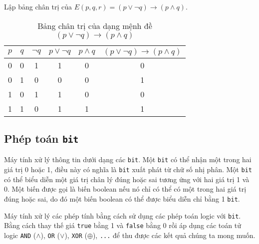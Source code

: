 \documentclass{standalone} %
\begin{document}
        
        
        \begin{example}
            Lập bảng chân trị của $E(p, q, r) = (p \lor \neg q) \to (p \land q)$.
        \end{example}
        \begin{table}[h!]
            \centering
            \setlength{\tabcolsep}{18pt}
            \begin{tabular}{c c c c c c}
                $p$ & $q$ & $\neg q$ & $p \lor \neg q$ & $p \land q$ &  $(p \lor \neg q) \to (p \land q)$\\ \hline
                0 & 0 & 1 & 1 & 0 & 0\\
                0 & 1 & 0 & 0 & 0 & 1\\
                1 & 0 & 1 & 1 & 0 & 0\\
                1 & 1 & 0 & 1 & 1 & 1
            \end{tabular}
            \caption{Bảng chân trị của dạng mệnh đề $(p \lor \neg q) \to (p \land q)$}
        \end{table}
    \subsection{Phép toán \texttt{bit}} 
        Máy tính xử lý thông tin dưới dạng các \texttt{bit}. Một \texttt{bit} có thể nhận một trong hai giá trị 0 hoặc 1, điều này có nghĩa là \texttt{bit} xuất phát từ chữ số nhị phân. Một \texttt{bit} có thể biểu diễn một giá trị chân lý đúng hoặc sai tương ứng với hai giá trị 1 và 0. Một biến được gọi là biến boolean nếu nó chỉ có thể có một trong hai giá trị đúng hoặc sai, do đó một biến boolean có thể được biểu diễn chỉ bằng 1 \texttt{bit}.
        
        Máy tính xử lý các phép tính bằng cách sử dụng các phép toán logic với \texttt{bit}. Bằng cách thay thế giá \texttt{true} bằng 1 và \texttt{false} bằng 0 rồi áp dụng các toán tử logic \texttt{AND} ($\land$), \texttt{OR} ($\lor$), \texttt{XOR} ($\oplus$), \texttt{...} để thu được các kết quả chúng ta mong muốn.
        
\end{document}
